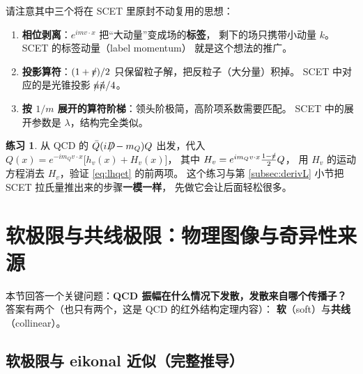 \documentclass[UTF8,a4paper,11pt]{ctexart}
\theoremstyle{definition}
\newtheorem{exercise}{练习}[section]
\theoremstyle{remark}
\theoremstyle{plain}
\newcommand{\nsl}{n\mkern-10.5mu/\mkern1.5mu}
\newcommand{\nbsl}{\bar{n}\mkern-10.5mu/\mkern1.5mu}
\newcommand{\Dsl}{D\mkern-11.5mu/}
\newcommand{\vsl}{v\mkern-9.0mu/}
\newcommand{\en}[1]{\textsf{#1}}   %
\begin{document}
请注意其中三个将在 SCET 里原封不动复用的思想：

\begin{enumerate}[label=(\alph*)]
  \item \textbf{相位剥离}：$e^{imv\cdot x}$ 把“大动量”变成场的\textbf{标签}，
        剩下的场只携带小动量 $k$。SCET 的标签动量（\en{label momentum}）
        就是这个想法的推广。
  \item \textbf{投影算符}：$(1+\vsl)/2$ 只保留粒子解，把反粒子（大分量）积掉。
        SCET 中对应的是光锥投影 $\nsl\nbsl/4$。
  \item \textbf{按 $1/m$ 展开的算符阶梯}：领头阶极简，高阶项系数需要匹配。
        SCET 中的展开参数是 $\lambda$，结构完全类似。
\end{enumerate}

\begin{exercise}
从 QCD 的 $\bar Q(i\Dsl-m_Q)Q$ 出发，代入
$Q(x)=e^{-im_Qv\cdot x}\big[h_v(x)+H_v(x)\big]$，
其中 $H_v=e^{im_Qv\cdot x}\tfrac{1-\vsl}{2}Q$，
用 $H_v$ 的运动方程消去 $H_v$，验证 \eqref{eq:lhqet} 的前两项。
这个练习与第 \ref{subsec:derivL} 小节把 SCET 拉氏量推出来的步骤\textbf{一模一样}，
先做它会让后面轻松很多。
\end{exercise}

\section{软极限与共线极限：物理图像与奇异性来源}
\label{sec:limits}

本节回答一个关键问题：\textbf{QCD 振幅在什么情况下发散，发散来自哪个传播子？}
答案有两个（也只有两个，这是 QCD 的红外结构定理内容）：
\textbf{软}（\en{soft}）与\textbf{共线}（\en{collinear}）。

\subsection{软极限与 eikonal 近似（完整推导）}
\label{subsec:eikonal}
\end{document}
